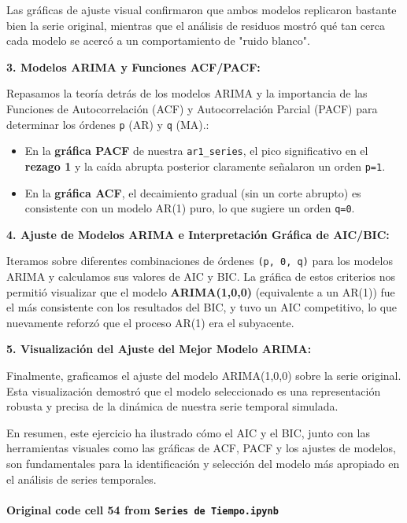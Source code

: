 \documentclass[
  11pt,
]{article}
\providecommand{\tightlist}{%
  \setlength{\itemsep}{0pt}\setlength{\parskip}{0pt}}
\begin{document}
Las gráficas de ajuste visual confirmaron que ambos modelos replicaron bastante bien la serie original, mientras que el análisis de residuos mostró qué tan cerca cada modelo se acercó a un comportamiento de "ruido blanco".

\textbf{3. Modelos ARIMA y Funciones ACF/PACF:}

Repasamos la teoría detrás de los modelos ARIMA y la importancia de las Funciones de Autocorrelación (ACF) y Autocorrelación Parcial (PACF) para determinar los órdenes \texttt{p} (AR) y \texttt{q} (MA).:

\begin{itemize}
\tightlist
\item
  En la \textbf{gráfica PACF} de nuestra \texttt{ar1\_series}, el pico significativo en el \textbf{rezago 1} y la caída abrupta posterior claramente señalaron un orden \texttt{p=1}.
\item
  En la \textbf{gráfica ACF}, el decaimiento gradual (sin un corte abrupto) es consistente con un modelo AR(1) puro, lo que sugiere un orden \texttt{q=0}.
\end{itemize}

\textbf{4. Ajuste de Modelos ARIMA e Interpretación Gráfica de AIC/BIC:}

Iteramos sobre diferentes combinaciones de órdenes \texttt{(p,\ 0,\ q)} para los modelos ARIMA y calculamos sus valores de AIC y BIC. La gráfica de estos criterios nos permitió visualizar que el modelo \textbf{ARIMA(1,0,0)} (equivalente a un AR(1)) fue el más consistente con los resultados del BIC, y tuvo un AIC competitivo, lo que nuevamente reforzó que el proceso AR(1) era el subyacente.

\textbf{5. Visualización del Ajuste del Mejor Modelo ARIMA:}

Finalmente, graficamos el ajuste del modelo ARIMA(1,0,0) sobre la serie original. Esta visualización demostró que el modelo seleccionado es una representación robusta y precisa de la dinámica de nuestra serie temporal simulada.

En resumen, este ejercicio ha ilustrado cómo el AIC y el BIC, junto con las herramientas visuales como las gráficas de ACF, PACF y los ajustes de modelos, son fundamentales para la identificación y selección del modelo más apropiado en el análisis de series temporales.

\paragraph{\texorpdfstring{Original code cell 54 from \texttt{Series\ de\ Tiempo.ipynb}}{Original code cell 54 from Series de Tiempo.ipynb}}\label{original-code-cell-54-from-series-de-tiempoipynb}
\end{document}
